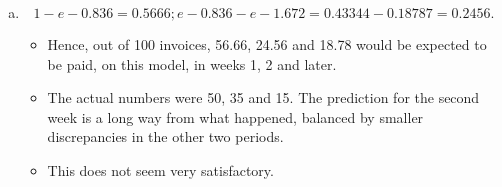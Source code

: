 \documentclass[a4paper,12pt]{article}
\begin{document}
\begin{enumerate}[(a)]
\begin{framed}
(iii) Assuming that λ = 0.836, calculate each of the expected numbers of invoices
settled within the first week, settled during the second week, and settled after 2
weeks. Hence comment briefly on how well the model pdf f (t) fits the data.
(5)
\end{framed}
\item  \[1- e-0.836 = 0.5666; e-0.836 - e-1.672 = 0.43344 - 0.18787 = 0.2456 . \]

\begin{itemize}
\item Hence, out
of 100 invoices, 56.66, 24.56 and 18.78 would be expected to be paid, on this model,
in weeks 1, 2 and later. 
\item The actual numbers were 50, 35 and 15. The prediction for
the second week is a long way from what happened, balanced by smaller
discrepancies in the other two periods. 
\item This does not seem very satisfactory.
\end{itemize}
\end{enumerate}
\end{document}
